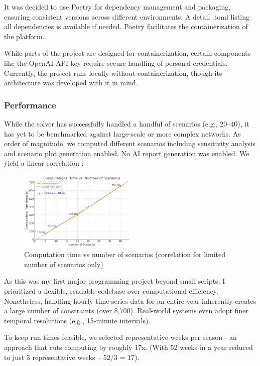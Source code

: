 It was decided to use Poetry for dependency management and packaging, ensuring consistent versions across 
different environments. A detail .toml listing all dependencies is available if needed. Poetry facilitates 
the containerization of the platform.

While parts of the project are designed for containerization, certain components like the OpenAI API key require 
secure handling of personal credentials. Currently, the project runs locally without containerization, 
though its architecture was developed with it in mind.

\subsubsection{Performance}
\label{sec:performance_scalability}

While the solver has successfully handled a handful of scenarios (e.g., 20--40), it has yet to be benchmarked 
against large-scale or more complex networks. As order of magnitude, we computed different scenarios 
including sensitivity analysis and scenario plot generation enabled. No AI report generation was enabled.
We yield a linear correlation :

\begin{figure}[h]
    \centering
    \includegraphics[width=0.5\textwidth]{images/time-comput.png}
    \caption{Computation time vs number of scenarios (correlation for limited number of scenarios only)}
    \label{fig:computation-time}
\end{figure}

As this was my first major programming project beyond small scripts, I prioritized a flexible, 
readable codebase over computational efficiency. Nonetheless, handling hourly time-series data for an 
entire year inherently creates a large number of constraints (over 8,700). Real-world systems even adopt 
finer temporal resolutions (e.g., 15-minute intervals). 

To keep run times feasible, we selected representative weeks per season—an approach that cuts computing by 
roughly 17x. (With 52 weeks in a year reduced to just 3 representative weeks -- 52/3 = 17).

